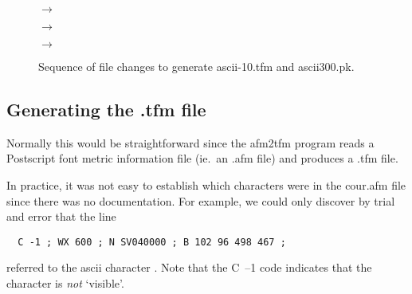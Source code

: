 \begin{figure}[h,t]
\begin{center}
%
%
\vbox{%
      $\longrightarrow$
%
%
}


\vspace{1cm}

%
%
$\longrightarrow$
%

\vspace{1cm}

%

%
$\longrightarrow$
%
%
\end{center}
\caption{Sequence of file changes to generate {\sc ascii-10.tfm} and
         {\sc ascii300.pk}.}
 \label{boxes}
\end{figure}


\subsection{Generating the {\sc .tfm} file}

Normally this would  be straightforward since the {\sc afm2tfm} program
reads a Postscript font metric information file (ie.\ an {\sc .afm} file)
and produces a {\sc .tfm} file.

\newpage
In practice, it was not easy to establish which characters were in the
{\sc cour.afm} file since there was no documentation.
For example, we could only discover by trial and error that the line
\begin{verbatim}
  C -1 ; WX 600 ; N SV040000 ; B 102 96 498 467 ;
\end{verbatim}
referred to the {\sc ascii} character {\ascii \US}. Note that the
\hbox{C --1} code indicates that the  character is {\it not\/} `visible'.


